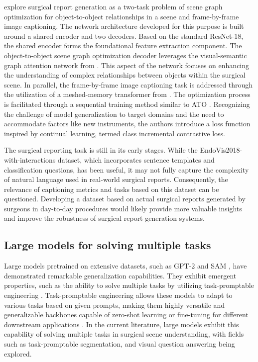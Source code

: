 \documentclass[times,twocolumn,final]{elsarticle}
\renewcommand{\cite}[1]{\citep{#1}}
\begin{document}
\citet{mobarakol_task_aware} explore surgical report generation as a two-task problem of scene graph optimization for object-to-object relationships in a scene and frame-by-frame image captioning. The network architecture developed for this purpose is built around a shared encoder and two decoders.
Based on the standard ResNet-18, the shared encoder forms the foundational feature extraction component. The object-to-object scene graph optimization decoder leverages the visual-semantic graph attention network from \citet{9739429}. This aspect of the network focuses on enhancing the understanding of complex relationships between objects within the surgical scene.
In parallel, the frame-by-frame image captioning task is addressed through the utilization of a meshed-memory transformer from \citet{Cornia_2020_CVPR}. 
The optimization process is facilitated through a sequential training method similar to  ATO \citep{islam2020apmtl}. 
Recognizing the challenge of model generalization to target domains and the need to accommodate factors like new instruments, the authors introduce a loss function inspired by continual learning, termed class incremental contrastive loss. 

The surgical reporting task is still in its early stages. While the EndoVis2018-with-interactions dataset, which incorporates sentence templates and classification questions, has been useful, it may not fully capture the complexity of natural language used in real-world surgical reports. Consequently, the relevance of captioning metrics and tasks based on this dataset can be questioned. Developing a dataset based on actual surgical reports generated by surgeons in day-to-day procedures would likely provide more valuable insights and improve the robustness of surgical report generation systems.

\subsection{Large models for solving multiple tasks}
Large models pretrained on extensive datasets, such as GPT-2 \cite{radford2021learning} and SAM \cite{kirillov2023segment}, have demonstrated remarkable generalization capabilities. They exhibit emergent properties, such as the ability to solve multiple tasks by utilizing task-promptable engineering \cite{radford2019language, kirillov2023segment}. Task-promptable engineering allows these models to adapt to various tasks based on given prompts, making them highly versatile and generalizable backbones capable of zero-shot learning or fine-tuning for different downstream applications \cite{su2024stem}. In the current literature, large models exhibit this capability of solving multiple tasks in surgical scene understanding, with fields such as task-promptable segmentation, and visual question answering being explored.
\end{document}
